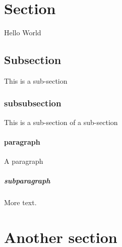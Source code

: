 \documentclass{article}
\begin{document}
\section{Section}
Hello World
\subsection{Subsection}
This is a sub-section
\subsubsection{subsubsection}
This is a sub-section of a sub-section
\paragraph{paragraph}
A paragraph
\subparagraph{subparagraph}
More text.
\section{Another section}
\end{document}
